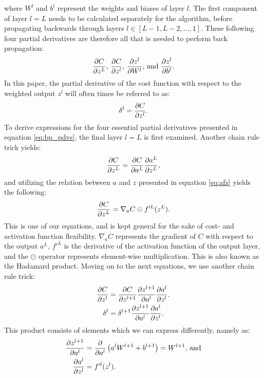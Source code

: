             where $W^l$ and $b^l$ represent the weights and biases of layer $l$. The first component of layer $l=L$ needs to be calculated separately for the algorithm, before propagating backwards through layers $l \in [L-1, L-2, \hdots, 1]$. These following four partial derivatives are therefore all that is needed to perform back propagation:
            \begin{equation}\label{eq:bp_pdvs}
                \pdv{C}{z^L} \text{, } \pdv{C}{z^l} \text{, } \pdv{z^l}{W^l} \text{, and } \pdv{z^l}{b^l}.
            \end{equation}
            In this paper, the partial derivative of the cost function with respect to the weighted output $z^l$ will often times be referred to as:
            \begin{equation}
                \delta^l = \pdv{C}{z^l}.
            \end{equation}
            To derive expressions for the four essential partial derivatives presented in equation \ref{eq:bp_pdvs}, the final layer $l=L$ is first examined. Another chain rule trick yields:
            \begin{equation}
                \pdv{C}{z^L} = \pdv{C}{a^L} \pdv{a^L}{z^L},
            \end{equation}
            and utilizing the relation between $a$ and $z$ presented in equation \ref{eq:afz} yields the following:
            \begin{equation}
                \pdv{C}{z^L} = \nabla_a C \odot f'^L(z^L).
            \end{equation}
            This is one of our equations, and is kept general for the sake of cost- and activation function flexibility. $\nabla_aC$ represents the gradient of $C$ with respect to the output $a^L$, $f'^L$ is the derivative of the activation function of the output layer, and the $\odot$ operator represents element-wise multiplication. This is also known as the Hadamard product. Moving on to the next equations, we use another chain rule trick:
            \begin{align}\label{eq:C/zl}
                \pdv{C}{z^l} &= \pdv{C}{z^{l+1}} \pdv{z^{l+1}}{a^l} \pdv{a^l}{z^l}.\\
                \delta^l &= \delta^{l+1} \pdv{z^{l+1}}{a^l} \pdv{a^l}{z^l}.
            \end{align}
            This product consists of elements which we can express differently, namely as:
            \begin{align}\label{eq:C/zl1}
                \pdv{z^{l+1}}{a^l} &= \pdv{}{a^l}\left( a^lW^{l+1} + b^{l+1} \right)=W^{l+1}\text{, and}\\\label{eq:C/zl2}
                \pdv{a^l}{z^l} &= f'^l(z^l).
            \end{align}
